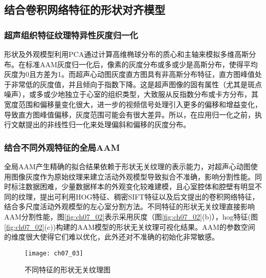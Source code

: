 \subsection{结合卷积网络特征的形状对齐模型} 

\subsubsection{超声组织特征纹理特异性灰度归一化} 
形状及外观模型利用PCA通过计算高维椭球分布的质心和主轴来模拟多维高斯分布。在标准AAM灰度归一化后，像素的灰度分布或多或少是高斯分布，使得平均灰度为0且方差为1。而超声心动图灰度直方图具有非高斯分布特征，直方图峰值处于非常低的灰度值，并且倾向于指数下降。这是超声图像的固有属性（尤其是斑点噪声），或多或少地独立于心室的组织类型，大致服从反指数分布或卡方分布\citep{Bosch2002}，其宽度范围和偏移量变化很大，进一步的视频信号处理引入更多的偏移和增益变化，导致直方图峰值偏移，灰度范围可能会有很大差异。所以，在应用归一化之前，执行文献提出的非线性归一化来处理偏斜和偏移的灰度分布。

\subsubsection{结合不同外观特征的全局AAM}
全局AAM产生精确的拟合结果依赖于形状无关纹理的表示能力，对超声心动图使用图像灰度作为原始纹理来建立活动外观模型导致拟合不准确，影响分割性能。同时标注数据困难，少量数据样本的外观变化较难建模，且心室腔体和腔壁有明显不同的纹理，提出可利用HOG特征、稠密SIFT特征以及后文提出的卷积网络特征，结合多尺度活动外观模型的左心室分割方法。不同特征的形状无关纹理直接影响AAM分割性能，图\ref{fig:ch07_02}表示采用灰度（图\ref{fig:ch07_02}(b)），hog特征(图\ref{fig:ch07_02}(c))构建的AAM模型的形状无关纹理可视化结果。AAM的参数空间的维度很大使得它们难以优化，此外还对不准确的初始化非常敏感。
\begin{figure}[!htbp]
\centering
\texttt{[image: ch07\_03]}
\caption{不同特征的形状无关纹理图}
\label{fig:ch07_03}
\end{figure} 
 
